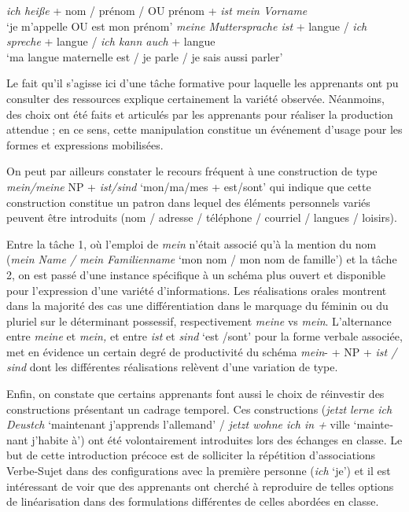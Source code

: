 \documentclass[output=paper]{langscibook}
\begin{document}
\begin{otherlanguage}{french}
\ea%
    \label{ex:felce:6}
    \ea  \textit{ich heiße} + nom / prénom / OU prénom + \textit{ist mein Vorname} \\
    \relax  `je m’appelle OU est mon prénom'
    \ex  \textit{meine Muttersprache ist} + langue / \textit{ich spreche} + langue / \textit{ich kann auch} + langue \\
    \relax  `ma langue maternelle est / je parle / je sais aussi parler'
    \z
 \z

Le fait qu’il s’agisse ici d’une tâche formative pour laquelle les apprenants ont pu consulter des ressources explique certainement la variété observée. Néanmoins, des choix ont été faits et articulés par les apprenants pour réaliser la production attendue ; en ce sens, cette manipulation constitue un événement d’usage pour les formes et expressions mobilisées.

On peut par ailleurs constater le recours fréquent à une construction de type \textit{mein/meine} NP + \textit{ist/sind} `mon/ma/mes + est/sont' qui indique que cette construction constitue un patron dans lequel des éléments personnels variés peuvent être introduits (nom / adresse / téléphone / courriel / langues / loisirs). 

Entre la tâche 1, où l’emploi de \textit{mein} n’était associé qu’à la mention du nom (\textit{mein Name / mein Familienname} `mon nom / mon nom de famille') et la tâche 2, on est passé d’une instance spécifique à un schéma plus ouvert et disponible pour l’expression d’une variété d’informations. Les réalisations orales montrent dans la majorité des cas une différentiation dans le marquage du féminin ou du pluriel sur le déterminant possessif, respectivement \textit{meine} vs \textit{mein}. L’alternance entre \textit{meine} et \textit{mein,} et entre \textit{ist} et \textit{sind} `est /sont' pour la forme verbale associée, met en évidence un certain degré de productivité du schéma \textit{mein}- + NP + \textit{ist / sind} dont les différentes réalisations relèvent d’une variation de type.

Enfin, on constate que certains apprenants font aussi le choix de réinvestir des constructions présentant un cadrage temporel. Ces constructions (\textit{jetzt lerne ich Deustch} `maintenant j’apprends l’allemand' / \textit{jetzt wohne ich in +} ville `maintenant j’habite à') ont été volontairement introduites lors des échanges en classe. Le but de cette introduction précoce est de solliciter la répétition d’associations Verbe-Sujet dans des configurations avec la première personne (\textit{ich} `je') et il est intéressant de voir  que des apprenants ont cherché à reproduire de telles options de linéarisation dans des formulations différentes de celles abordées en classe.


\end{otherlanguage}
\end{document}
